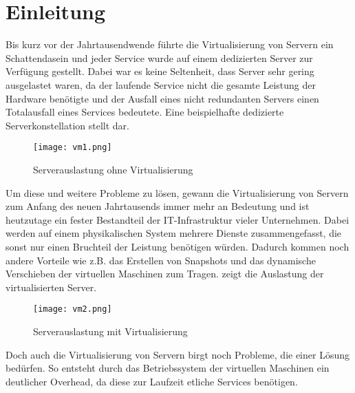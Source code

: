 \section{Einleitung}
\label{sec:Einleitung}
Bis kurz vor der Jahrtausendwende führte die Virtualisierung von Servern ein Schattendasein und jeder Service wurde auf einem dedizierten Server zur Verfügung gestellt.
Dabei war es keine Seltenheit, dass Server sehr gering ausgelastet waren, da der laufende Service nicht die gesamte Leistung der Hardware benötigte und der Ausfall eines nicht redundanten Servers einen Totalausfall eines Services bedeutete.
Eine beispielhafte dedizierte Serverkonstellation stellt  dar.
\begin{figure}[H]
	\vspace{-20pt}
	\begin{center}
		\texttt{[image: vm1.png]}
	\end{center}
	\caption[Serverauslastung ohne Virtualisierung]{Serverauslastung ohne Virtualisierung \footnotemark}
	\vspace{-20pt}
	\label{fig:HW1}
\end{figure}
Um diese und weitere Probleme zu lösen, gewann die Virtualisierung von Servern zum Anfang des neuen Jahrtausends immer mehr an Bedeutung und ist heutzutage ein fester Bestandteil der IT-Infrastruktur vieler Unternehmen.
Dabei werden auf einem physikalischen System mehrere Dienste zusammengefasst, die sonst nur einen Bruchteil der Leistung benötigen würden.
Dadurch kommen noch andere Vorteile wie z.B. das Erstellen von Snapshots und das dynamische Verschieben der virtuellen Maschinen zum Tragen.
 zeigt die Auslastung der virtualisierten Server.
\begin{figure}[H]
	\begin{center}
		\texttt{[image: vm2.png]}
	\end{center}
	\caption[Serverauslastung mit Virtualisierung]{Serverauslastung mit Virtualisierung \footnotemark}
	\label{fig:HW2}
	\vspace{-30pt}
\end{figure}
Doch auch die Virtualisierung von Servern birgt noch Probleme, die einer Lösung bedürfen.
So entsteht durch das Betriebssystem der virtuellen Maschinen ein deutlicher Overhead, da diese zur Laufzeit etliche Services benötigen.
